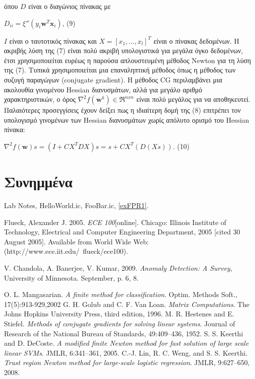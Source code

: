 \documentclass[a4paper, 11pt]{article}
\begin{document}
όπου $D$ είναι ο διαγώνιος πίνακας με
\begin{center}
$D_{ii}=\xi''(y_i\textbf{w}^T\textbf{x}_i)$, (9) 
\end{center}
$Ι$ είναι ο ταυτοτικός πίνακας και $X = [x_1, ...,x_l]^T$ είναι ο πίνακας δεδομένων.
Η ακριβής λύση της (7) είναι πολύ ακριβή υπολογιστικά για μεγάλα όγκο δεδομένων, έτσι χρησιμοποιείται ευρέως η παρούσα απλουστευμένη μέθοδος Newton για τη λύση της (7). Τυπικά χρησιμοποιείται μια επαναληπτική μέθοδος όπως η μέθοδος των συζυγή παραγώγων (conjugate gradient)\cite{m_comp,CG}. Η μέθοδος CG περιλαμβάνει μια ακολουθία γινομένου Hessian διανυσμάτων, αλλά για μεγάλο αριθμό χαρακτηριστικών, ο όρος $\nabla^2f(\textbf{w}^k)\in\Re^{nxn}$ είναι πολύ μεγάλος για να αποθηκευτεί. Παλαιότερες προσεγγίσεις \cite{m_finite, Trust_region} έχουν δείξει πως η ιδιαίτερη δομή της (8) επιτρέπει τον υπολογισμό γινομένων των Hessian διανυσμάτων χωρίς απόλυτο ορισμό του Hessian πίνακα:
\begin{center}
$\nabla^2f(\textbf{w})s = (I+CX^TDX)s = s + CX^T(D(Xs))$. (10)
\end{center}

\section*{Συνημμένα}
\ifx
Lab Notes, HelloWorld.ic, FooBar.ic,
\ref{exFPR1}.
\fi %


\begin{thebibliography}{9}
\ifx
{}  Flueck, Alexander J. 2005. \emph{ECE 100}[online]. Chicago: Illinois Institute of Technology, Electrical and Computer Engineering Department, 2005 [cited 30
August 2005]. Available from World Wide Web: (http://www.ece.iit.edu/~flueck/ece100).

 V. Chandola, A. Banerjee, V. Kumar, 2009. \emph{Anomaly Detection: A Survey}, University of Minnesota. September, p. 6, 8.
\fi

 O. L. Mangasarian. \emph{A finite method for classification}. Optim. Methods Soft., 17(5):913-929,2002
 G. H. Golub and C. F. Van Loan. \emph{Matrix Computations}. The Johns Hopkins
University Press, third edition, 1996.
 M. R. Hestenes and E. Stiefel. \emph{Methods of conjugate gradients for solving linear
systems}. Journal of Research of the National Bureau of Standards, 49:409–436, 1952.
 S. S. Keerthi and D. DeCoste. \emph{A modified finite Newton method for fast solution
of large scale linear SVMs}. JMLR, 6:341–361, 2005.
 C.-J. Lin, R. C. Weng, and S. S. Keerthi. \emph{Trust region Newton method for large-scale logistic regression}. JMLR, 9:627–650, 2008.

\end{thebibliography}
\end{document}
